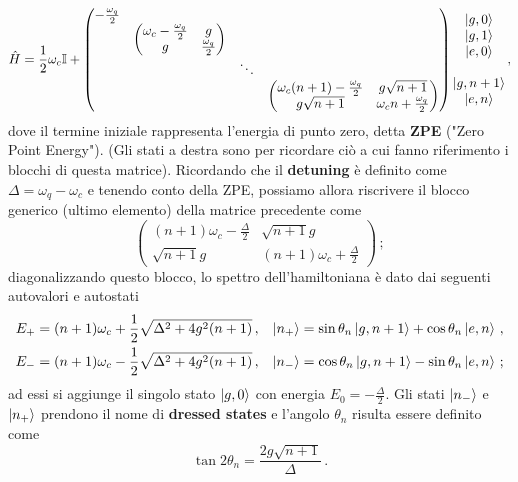 \begin{equation*}
    \hat H = \frac 12 \omega_c \mathbb{I} + 
    \begin{pmatrix}
        -\frac{\omega_q}2 & & & \\
        & \begin{pmatrix}
            \omega_c - \frac{\omega_q}2 & g \\
            g & \frac{\omega_q}2
          \end{pmatrix} & & \\
        & & \ddots & \\
        & & & \begin{pmatrix}
            \omega_c(n+1) - \frac{\omega_q}2 & g\sqrt{n+1} \\
            g\sqrt{n+1} & \omega_c n + \frac{\omega_q}2
        \end{pmatrix} \\
    \end{pmatrix}
    \begin{matrix}
        \ket{g,0}\\
        \ket{g,1}\\
        \ket{e,0}\\
        \\
        \ket{g,n+1}\\
        \ket{e,n}
    \end{matrix}\, ,
\end{equation*}
dove il termine iniziale rappresenta l'energia di punto zero, detta \textbf{ZPE} ("Zero Point Energy"). (Gli stati a destra sono per ricordare ciò a cui fanno riferimento i blocchi di questa matrice). Ricordando che il \textbf{detuning} è definito come $\Delta=\omega_q - \omega_c$ e tenendo conto della ZPE, possiamo allora riscrivere il blocco generico (ultimo elemento) della matrice precedente come
\begin{equation*}
    \begin{pmatrix}
        (n+1)\omega_c - \frac{\Delta}2 & \sqrt{n+1}g \\
        \sqrt{n+1}g & (n+1)\omega_c + \frac{\Delta}2
    \end{pmatrix} \, ;
\end{equation*}
diagonalizzando questo blocco, lo spettro dell'hamiltoniana è dato dai seguenti autovalori e autostati
\begin{align*}
    E_+ &= (n+1)\omega_c + \frac 12 \sqrt{\Delta^2+4g^2(n+1)} \, , &\ket{n_+} &= \sin\theta_n \ket{g,n+1} + \cos\theta_n\ket{e,n} \, , \\
    E_- &= (n+1)\omega_c - \frac 12 \sqrt{\Delta^2+4g^2(n+1)} \, , &\ket{n_-} &= \cos\theta_n\ket{g,n+1}-\sin\theta_n\ket{e,n} \, ;
\end{align*} 
ad essi si aggiunge il singolo stato $\ket{g,0}$ con energia $E_0 = - \frac{\Delta}{2}$. Gli stati $\ket{n_-}$ e $\ket{n_+}$ prendono il nome di \textbf{dressed states} e l'angolo $\theta_n$ risulta essere definito come
\begin{equation*}
    \tan {2 \theta_n} = \frac{2g\sqrt{n+1}}{\Delta} \, .
\end{equation*}

